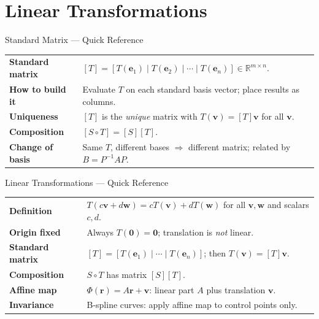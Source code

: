 

\section{Linear Transformations}

\begin{toolkitbox}{Standard Matrix --- Quick Reference}
\begin{tabular}{@{}p{}p{}@{}}
\textbf{Standard matrix}      & $[T] = [T(\mathbf{e}_1)\mid T(\mathbf{e}_2)\mid\cdots\mid T(\mathbf{e}_n)] \in \mathbb{R}^{m\times n}$. \\[4pt]
\textbf{How to build it}       & Evaluate $T$ on each standard basis vector; place results as columns. \\[4pt]
\textbf{Uniqueness}            & $[T]$ is the \emph{unique} matrix with $T(\mathbf{v}) = [T]\mathbf{v}$ for all $\mathbf{v}$. \\[4pt]
\textbf{Composition}           & $[S \circ T] = [S][T]$. \\[4pt]
\textbf{Change of basis}       & Same $T$, different bases $\Rightarrow$ different matrix; related by $B = P^{-1}AP$. \\
\end{tabular}
\end{toolkitbox}


\begin{toolkitbox}{Linear Transformations --- Quick Reference}
\begin{tabular}{@{}p{}p{}@{}}
\textbf{Definition}        & $T(c\mathbf{v} + d\mathbf{w}) = cT(\mathbf{v}) + dT(\mathbf{w})$ for all $\mathbf{v},\mathbf{w}$ and scalars $c,d$. \\[4pt]
\textbf{Origin fixed}      & Always $T(\mathbf{0}) = \mathbf{0}$; translation is \emph{not} linear. \\[4pt]
\textbf{Standard matrix}   & $[T] = [T(\mathbf{e}_1)\mid\cdots\mid T(\mathbf{e}_n)]$; then $T(\mathbf{v}) = [T]\mathbf{v}$. \\[4pt]
\textbf{Composition}       & $S \circ T$ has matrix $[S][T]$. \\[4pt]
\textbf{Affine map}        & $\Phi(\mathbf{r}) = A\mathbf{r} + \mathbf{v}$: linear part $A$ plus translation $\mathbf{v}$. \\[4pt]
\textbf{Invariance}        & B-spline curves: apply affine map to control points only. \\
\end{tabular}
\end{toolkitbox}





